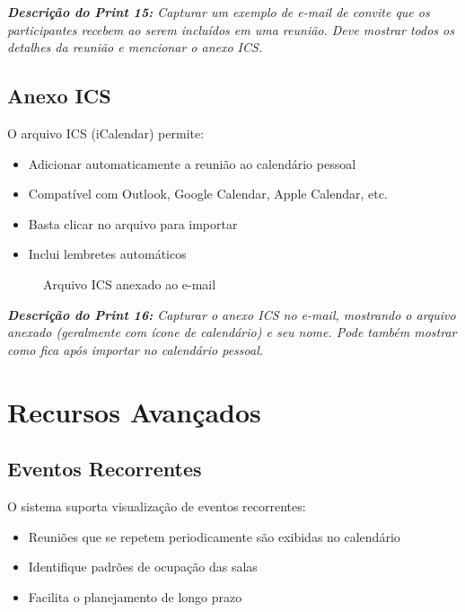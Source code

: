 \documentclass[12pt,a4paper]{article}
\begin{document}
\textit{\textbf{Descrição do Print 15:} Capturar um exemplo de e-mail de convite que os participantes recebem ao serem incluídos em uma reunião. Deve mostrar todos os detalhes da reunião e mencionar o anexo ICS.}

\subsection{Anexo ICS}

O arquivo ICS (iCalendar) permite:

\begin{itemize}[leftmargin=*]
    \item Adicionar automaticamente a reunião ao calendário pessoal
    \item Compatível com Outlook, Google Calendar, Apple Calendar, etc.
    \item Basta clicar no arquivo para importar
    \item Inclui lembretes automáticos
\end{itemize}

\begin{figure}[H]
    \centering
    \caption{Arquivo ICS anexado ao e-mail}
    \label{fig:ics}
\end{figure}

\textit{\textbf{Descrição do Print 16:} Capturar o anexo ICS no e-mail, mostrando o arquivo anexado (geralmente com ícone de calendário) e seu nome. Pode também mostrar como fica após importar no calendário pessoal.}

\newpage

\section{Recursos Avançados}

\subsection{Eventos Recorrentes}

O sistema suporta visualização de eventos recorrentes:

\begin{itemize}[leftmargin=*]
    \item Reuniões que se repetem periodicamente são exibidas no calendário
    \item Identifique padrões de ocupação das salas
    \item Facilita o planejamento de longo prazo
\end{itemize}
\end{document}
